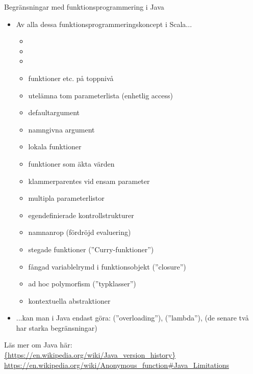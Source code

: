 \begin{Slide}{Begränsningar med funktionsprogrammering i Java}
\begin{itemize}\SlideFontTiny
\item[] Av alla dessa funktionsprogrammeringskoncept i Scala...
\begin{itemize}
\item {}
\item {}
\item {}
\item funktioner etc. på toppnivå
\item utelämna tom parameterlista (enhetlig access)
\item defaultargument
\item namngivna argument
\item lokala funktioner
\item funktioner som äkta värden
\item klammerparentes vid ensam parameter
\item multipla parameterlistor
\item egendefinierade kontrollstrukturer
\item namnanrop (fördröjd evaluering)
\item stegade funktioner (''Curry-funktioner'')
\item fångad variablelrymd i funktionsobjekt (''closure'')
\item ad hoc polymorfism (''typklasser'')
\item kontextuella abstraktioner
\end{itemize}
\item[] ...kan man i Java %
endast göra:  (''overloading''),  (''lambda''),  (de senare två har starka begränsningar) 

\end{itemize}
\ifkompendium\else
\vfill{} 
\fi{} Läs mer om Java här:\\
\url{{https://en.wikipedia.org/wiki/Java_version_history}}
\url{https://en.wikipedia.org/wiki/Anonymous_function\#Java_Limitations}

\end{Slide}

